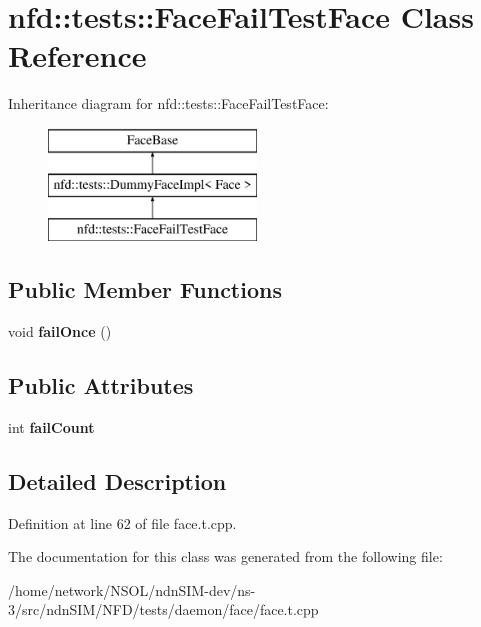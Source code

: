 \hypertarget{classnfd_1_1tests_1_1FaceFailTestFace}{}\section{nfd\+:\+:tests\+:\+:Face\+Fail\+Test\+Face Class Reference}
\label{classnfd_1_1tests_1_1FaceFailTestFace}
Inheritance diagram for nfd\+:\+:tests\+:\+:Face\+Fail\+Test\+Face\+:\begin{figure}[H]
\begin{center}
\leavevmode
\includegraphics[height=3.000000cm]{classnfd_1_1tests_1_1FaceFailTestFace}
\end{center}
\end{figure}
\subsection*{Public Member Functions}
\begin{DoxyCompactItemize}
\item 
void {\bfseries fail\+Once} ()\hypertarget{classnfd_1_1tests_1_1FaceFailTestFace_a1716dc25ffe2238ae26110ad10790e7f}{}\label{classnfd_1_1tests_1_1FaceFailTestFace_a1716dc25ffe2238ae26110ad10790e7f}

\end{DoxyCompactItemize}
\subsection*{Public Attributes}
\begin{DoxyCompactItemize}
\item 
int {\bfseries fail\+Count}\hypertarget{classnfd_1_1tests_1_1FaceFailTestFace_a09ec65bfc0db77be638136f4c77e376c}{}\label{classnfd_1_1tests_1_1FaceFailTestFace_a09ec65bfc0db77be638136f4c77e376c}

\end{DoxyCompactItemize}


\subsection{Detailed Description}


Definition at line 62 of file face.\+t.\+cpp.



The documentation for this class was generated from the following file\+:\begin{DoxyCompactItemize}
\item 
/home/network/\+N\+S\+O\+L/ndn\+S\+I\+M-\/dev/ns-\/3/src/ndn\+S\+I\+M/\+N\+F\+D/tests/daemon/face/face.\+t.\+cpp\end{DoxyCompactItemize}
